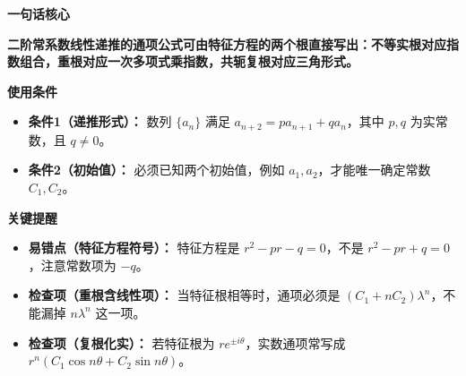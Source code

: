 \begin{summarybox}
	\textbf{\textcolor{CSummary}{一句话核心}}

	\textbf{二阶常系数线性递推的通项公式可由特征方程的两个根直接写出：不等实根对应指数组合，重根对应一次多项式乘指数，共轭复根对应三角形式。}

	\medskip
	\textbf{\textcolor{CSummary}{使用条件}}
	\begin{itemize}[leftmargin=*, itemsep=0.5em, topsep=0.4em]
		\item \textbf{条件1（递推形式）：} 数列 \(\{a_n\}\) 满足 \(a_{n+2}=p a_{n+1}+q a_n\)，其中 \(p,q\) 为实常数，且 \(q\neq0\)。
		\item \textbf{条件2（初始值）：} 必须已知两个初始值，例如 \(a_1,a_2\)，才能唯一确定常数 \(C_1,C_2\)。
	\end{itemize}

	\medskip
	\textbf{\textcolor{CSummary}{关键提醒}}
	\begin{itemize}[leftmargin=*, itemsep=0.5em, topsep=0.4em]
		\item \textbf{易错点（特征方程符号）：} 特征方程是 \(r^2-pr-q=0\)，不是 \(r^2-pr+q=0\)，注意常数项为 \(-q\)。
		\item \textbf{检查项（重根含线性项）：} 当特征根相等时，通项必须是 \((C_1+nC_2)\lambda^n\)，不能漏掉 \(n\lambda^n\) 这一项。
		\item \textbf{检查项（复根化实）：} 若特征根为 \(re^{\pm i\theta}\)，实数通项常写成 \(r^n(C_1\cos n\theta+C_2\sin n\theta)\)。
	\end{itemize}
\end{summarybox}